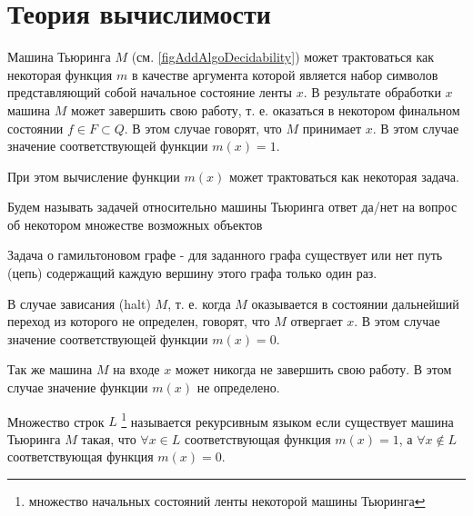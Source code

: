 \section{Теория вычислимости}

Машина Тьюринга $M$ (см. \autoref{figAddAlgoDecidability}) может
трактоваться как некоторая функция $m$ в качестве 
аргумента которой является набор символов представляющий собой
начальное состояние ленты $x$. В результате обработки $x$ машина $M$
может завершить свою работу, т. е. оказаться в некотором финальном
состоянии $f \in F \subset Q$. В этом случае говорят, что $M$
принимает $x$. В этом случае значение соответствующей функции 
$m(x) = 1$. 

При этом вычисление функции $m(x)$ может трактоваться как некоторая
задача.  
\begin{definition}[Задача]
Будем называть задачей относительно машины Тьюринга ответ да/нет на
вопрос об некотором множестве возможных объектов
\end{definition}

\begin{example}
Задача о гамильтоновом графе - для заданного графа существует или нет
путь (цепь) содержащий каждую вершину этого графа только один раз.
\nonumber
\end{example}




В случае зависания (halt) $M$, т. е. когда $M$
оказывается в состоянии дальнейший переход из которого не определен,
говорят, что $M$ отвергает $x$. В этом случае значение соответствующей
функции $m(x) =0$. 

Так же машина $M$ на входе $x$ может никогда не
завершить свою работу. В этом случае значение функции $m(x)$
не определено.    

\begin{definition}
Множество строк $L$
\footnote{множество начальных состояний ленты некоторой
машины Тьюринга}
называется рекурсивным языком если существует машина Тьюринга $M$
такая, что $\forall x \in L$ соответствующая функция $m(x) = 1$, а 
$\forall x \notin L$ соответствующая функция $m(x) = 0$. 
\end{definition}

